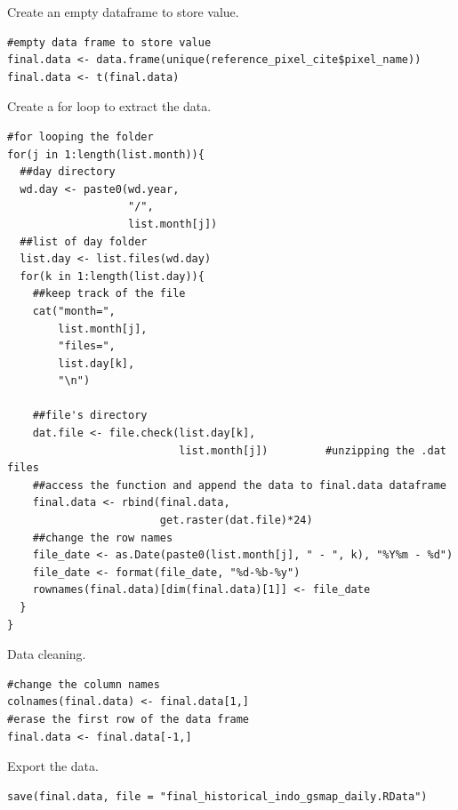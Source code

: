 \documentclass[12pt, a4paper]{article}
\begin{document}
\vskip 0.5cm
\noindent
Create an empty dataframe to store value.

\begin{lstlisting}
#empty data frame to store value
final.data <- data.frame(unique(reference_pixel_cite$pixel_name))
final.data <- t(final.data)
\end{lstlisting}


\newpage

\vskip 0.5cm
\noindent
Create a for loop to extract the data.

\begin{lstlisting}
#for looping the folder
for(j in 1:length(list.month)){
  ##day directory
  wd.day <- paste0(wd.year,
                   "/",
                   list.month[j])
  ##list of day folder
  list.day <- list.files(wd.day)
  for(k in 1:length(list.day)){
    ##keep track of the file
    cat("month=",
        list.month[j],
        "files=",
        list.day[k],
        "\n")
    
    ##file's directory
    dat.file <- file.check(list.day[k],
                           list.month[j])         #unzipping the .dat files
    ##access the function and append the data to final.data dataframe 
    final.data <- rbind(final.data,
                        get.raster(dat.file)*24)
    ##change the row names
    file_date <- as.Date(paste0(list.month[j], " - ", k), "%Y%m - %d")
    file_date <- format(file_date, "%d-%b-%y")
    rownames(final.data)[dim(final.data)[1]] <- file_date
  }
}
\end{lstlisting}

\vskip 0.5cm
\noindent
Data cleaning.

\begin{lstlisting}
#change the column names
colnames(final.data) <- final.data[1,]
#erase the first row of the data frame
final.data <- final.data[-1,]
\end{lstlisting}

\vskip 0.5cm
\noindent
Export the data.

\begin{lstlisting}
save(final.data, file = "final_historical_indo_gsmap_daily.RData")
\end{lstlisting}
\end{document}
